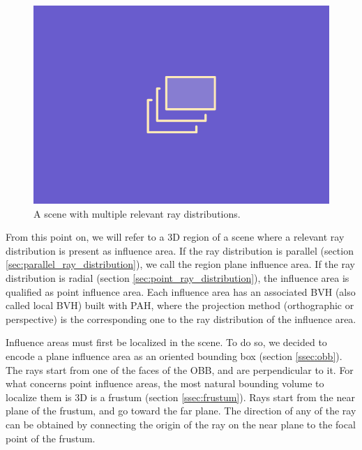\documentclass{PoliMi_MasterThesis}
\begin{document}
\begin{figure}[]
    \centering
    \includegraphics[width=\textwidth*\real{0.7}]{Images/TODO.png}
    \caption{A scene with multiple relevant ray distributions.}
    \label{fig:multiple_ray_distributions}
\end{figure}

From this point on, we will refer to a 3D region of a scene where a relevant ray distribution is present as influence area. If the ray distribution is parallel (section \ref{sec:parallel_ray_distribution}), we call the region plane influence area. If the ray distribution is radial (section \ref{sec:point_ray_distribution}), the influence area is qualified as point influence area. Each influence area has an associated BVH (also called local BVH) built with PAH, where the projection method (orthographic or perspective) is the corresponding one to the ray distribution of the influence area.

Influence areas must first be localized in the scene. To do so, we decided to encode a plane influence area as an oriented bounding box (section \ref{ssec:obb}). The rays start from one of the faces of the OBB, and are perpendicular to it. For what concerns point influence areas, the most natural bounding volume to localize them is 3D is a frustum (section \ref{ssec:frustum}). Rays start from the near plane of the frustum, and go toward the far plane. The direction of any of the ray can be obtained by connecting the origin of the ray on the near plane to the focal point of the frustum.
\end{document}
